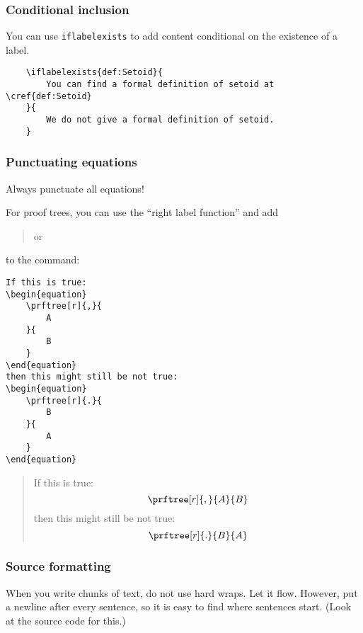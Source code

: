 \subsubsection*{Conditional inclusion}

You can use \texttt{iflabelexists} to add content conditional on the existence of a label.

\begin{verbatim}
    \iflabelexists{def:Setoid}{
        You can find a formal definition of setoid at \cref{def:Setoid}
    }{
        We do not give a formal definition of setoid.
    }
\end{verbatim}

\subsubsection*{Punctuating equations}

Always punctuate all equations!

For proof trees, you can use the ``right label function'' and add 
\begin{quote}\centering
    \str{[r]{,}} \qquad or \qquad \str{[r]{,}}  
\end{quote}
to the  command:
\begin{verbatim}
If this is true:
\begin{equation}
    \prftree[r]{,}{
        A
    }{ 
        B
    }
\end{equation}
then this might still be not true:
\begin{equation}
    \prftree[r]{.}{
        B
    }{ 
        A
    }
\end{equation}
\end{verbatim}
\begin{quote}
    If this is true:
    \begin{equation}
        \prftree[r]{,}{
            A
        }{ 
            B
        }
    \end{equation}
    then this might still be not true:
    \begin{equation}
        \prftree[r]{.}{
            B
        }{ 
            A
        }
    \end{equation}
\end{quote}
\subsubsection*{Source formatting}

When you write chunks of text, do not use hard wraps. %
Let it flow. %
However, put a newline after every sentence, so it is easy to find where sentences start.
(Look at the source code for this.)

